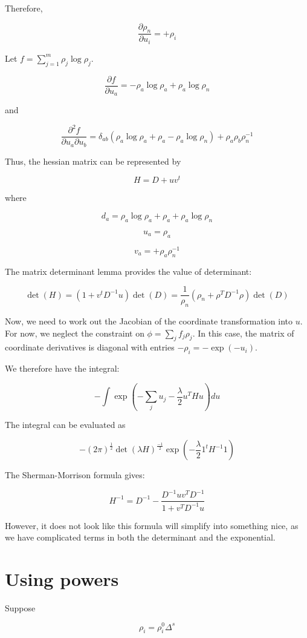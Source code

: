 \documentclass[12pt]{article}
\begin{document}
Therefore, 

$$\frac{\partial \rho_n}{\partial u_i} = + \rho_i$$

Let $f = \sum_{j=1}^m \rho_j \log \rho_j$.  

$$\frac{\partial f}{\partial u_a} =  - \rho_a \log \rho_a + \rho_a \log \rho_n$$

and 

$$\frac{\partial^2 f}{\partial u_a \partial u_b} =  \delta_{ab}(\rho_a \log \rho_a + \rho_a - \rho_a \log \rho_n) + \rho_a \rho_b \rho_n^{-1}$$

Thus, the hessian matrix can be represented by

$$H = D + u v^t$$

where 

$$d_a = \rho_a \log \rho_a + \rho_a + \rho_a \log \rho_n$$

$$u_a = \rho_a$$

$$v_a = +\rho_a \rho_n^{-1}$$

The matrix determinant lemma provides the value of determinant:

$$\det(H) = (1 + v^t D^{-1} u) \det(D) = \frac{1}{\rho_n} (\rho_n + \rho^T D^{-1} \rho) \det(D)$$

Now, we need to work out the Jacobian of the coordinate transformation into $u$.  For now, we neglect the constraint on $\phi = \sum_j f_j \rho_j$.  In this case, the matrix of coordinate derivatives is diagonal with entries $-\rho_i = -\exp(-u_i)$.  

We therefore have the integral:

$$-\int \exp(- \sum_j u_j -\frac{\lambda}{2} u^T H u) du $$

The integral can be evaluated as 

$$- (2\pi)^{\frac{1}{2}} \det(\lambda H)^{\frac{-1}{2}} \exp(-\frac{\lambda}{2} 1^t H^{-1} 1)$$

The Sherman-Morrison formula gives:

$$H^{-1} = D^{-1} - \frac{D^{-1} u v^T D^{-1}}{1 + v^T D^{-1} u}$$

However, it does not look like this formula will simplify into something nice, as we have complicated terms in both the determinant and the exponential.

\section{Using powers}

Suppose 

$$\rho_i = \rho_i^0 \Delta^s$$
\end{document}
